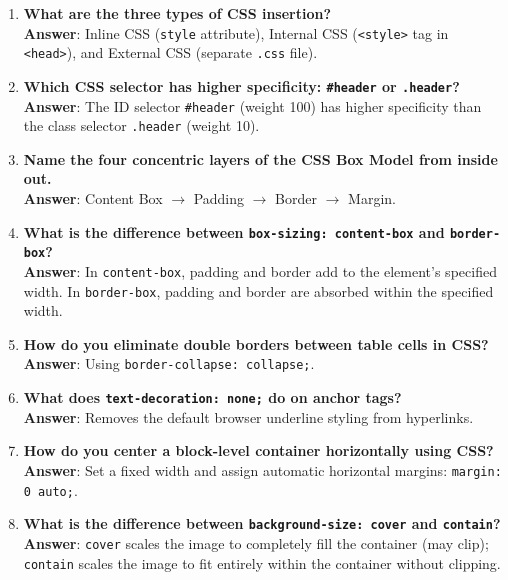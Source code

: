 \begin{enumerate}[leftmargin=1.5em]
    \item \textbf{What are the three types of CSS insertion?}\\
    \textbf{Answer}: Inline CSS (\texttt{style} attribute), Internal CSS (\texttt{<style>} tag in \texttt{<head>}), and External CSS (separate \texttt{.css} file).

    \item \textbf{Which CSS selector has higher specificity: \texttt{\#header} or \texttt{.header}?}\\
    \textbf{Answer}: The ID selector \texttt{\#header} (weight 100) has higher specificity than the class selector \texttt{.header} (weight 10).

    \item \textbf{Name the four concentric layers of the CSS Box Model from inside out.}\\
    \textbf{Answer}: Content Box $\to$ Padding $\to$ Border $\to$ Margin.

    \item \textbf{What is the difference between \texttt{box-sizing: content-box} and \texttt{border-box}?}\\
    \textbf{Answer}: In \texttt{content-box}, padding and border add to the element's specified width. In \texttt{border-box}, padding and border are absorbed within the specified width.

    \item \textbf{How do you eliminate double borders between table cells in CSS?}\\
    \textbf{Answer}: Using \texttt{border-collapse: collapse;}.

    \item \textbf{What does \texttt{text-decoration: none;} do on anchor tags?}\\
    \textbf{Answer}: Removes the default browser underline styling from hyperlinks.

    \item \textbf{How do you center a block-level container horizontally using CSS?}\\
    \textbf{Answer}: Set a fixed width and assign automatic horizontal margins: \texttt{margin: 0 auto;}.

    \item \textbf{What is the difference between \texttt{background-size: cover} and \texttt{contain}?}\\
    \textbf{Answer}: \texttt{cover} scales the image to completely fill the container (may clip); \texttt{contain} scales the image to fit entirely within the container without clipping.


\end{enumerate}
